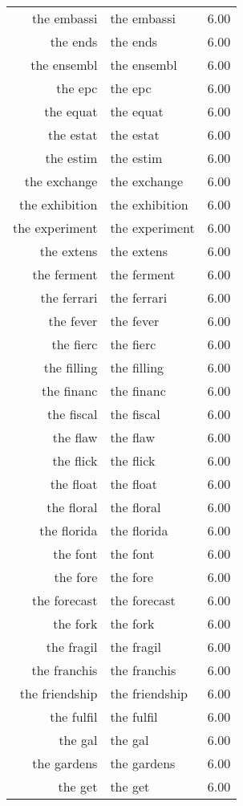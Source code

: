 \begin{table}[ht]
\begin{tabular}{rlr}
  the embassi & the embassi & 6.00 \\ 
  the ends & the ends & 6.00 \\ 
  the ensembl & the ensembl & 6.00 \\ 
  the epc & the epc & 6.00 \\ 
  the equat & the equat & 6.00 \\ 
  the estat & the estat & 6.00 \\ 
  the estim & the estim & 6.00 \\ 
  the exchange & the exchange & 6.00 \\ 
  the exhibition & the exhibition & 6.00 \\ 
  the experiment & the experiment & 6.00 \\ 
  the extens & the extens & 6.00 \\ 
  the ferment & the ferment & 6.00 \\ 
  the ferrari & the ferrari & 6.00 \\ 
  the fever & the fever & 6.00 \\ 
  the fierc & the fierc & 6.00 \\ 
  the filling & the filling & 6.00 \\ 
  the financ & the financ & 6.00 \\ 
  the fiscal & the fiscal & 6.00 \\ 
  the flaw & the flaw & 6.00 \\ 
  the flick & the flick & 6.00 \\ 
  the float & the float & 6.00 \\ 
  the floral & the floral & 6.00 \\ 
  the florida & the florida & 6.00 \\ 
  the font & the font & 6.00 \\ 
  the fore & the fore & 6.00 \\ 
  the forecast & the forecast & 6.00 \\ 
  the fork & the fork & 6.00 \\ 
  the fragil & the fragil & 6.00 \\ 
  the franchis & the franchis & 6.00 \\ 
  the friendship & the friendship & 6.00 \\ 
  the fulfil & the fulfil & 6.00 \\ 
  the gal & the gal & 6.00 \\ 
  the gardens & the gardens & 6.00 \\ 
  the get & the get & 6.00 \\ 

\end{tabular}
\end{table}
